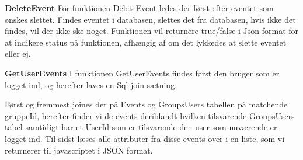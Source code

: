 \textbf{DeleteEvent}
\newline
\noindent 
For funktionen DeleteEvent ledes der først efter eventet som ønskes slettet. Findes eventet i databasen, slettes det fra databasen, hvis ikke det findes, vil der ikke ske noget. Funktionen vil returnere true/false i Json format for at indikere status på funktionen, afhængig af om det lykkedes at slette eventet eller ej. 

\textbf{GetUserEvents}
\newline
\noindent
I funktionen GetUserEvents findes først den bruger som er logget ind, og herefter laves en Sql join sætning. %


%

Først og fremmest joines der på Events og GroupsUsers tabellen på matchende gruppeId, herefter finder vi de events deriblandt hvilken tilsvarende GroupsUsers tabel samtidigt har et UserId som er tilsvarende den user som nuværende er logget ind. Til sidst læses alle attributer fra disse events over i en liste, som vi returnerer til javascriptet i JSON format.
